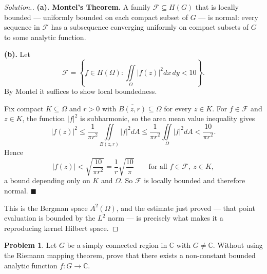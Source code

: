 \documentclass[11pt,a4paper]{article}
\theoremstyle{definition}
\newtheorem{problemx}{Problem}[section]
\newenvironment{problem}{\begin{problemx}}{\end{problemx}}
\newenvironment{solution}
  {\renewcommand{\qedsymbol}{}\begin{proof}[\textit{Solution}.]}
  {\end{proof}}
\begin{document}
\begin{solution}
\textbf{(a). Montel's Theorem.} A family $\mathcal{F} \subseteq H(G)$ that is
locally bounded --- uniformly bounded on each compact subset of $G$ --- is normal:
every sequence in $\mathcal{F}$ has a subsequence converging uniformly on compact
subsets of $G$ to some analytic function.

\textbf{(b).} Let
$$\mathcal{F} = \left\{ f \in H(\Omega) :
\iint\limits_{\Omega}\left|f(z)\right|^{2}dx\,dy < 10 \right\}.$$
By Montel it suffices to show local boundedness.

Fix compact $K \subseteq \Omega$ and $r > 0$ with
$\overline{B(z,r)} \subseteq \Omega$ for every $z \in K$. For $f \in \mathcal{F}$
and $z \in K$, the function $\left|f\right|^{2}$ is subharmonic, so the area
mean value inequality gives
$$\left|f(z)\right|^{2}
\leq \frac{1}{\pi r^{2}}\iint\limits_{B(z,r)}\left|f\right|^{2}dA
\leq \frac{1}{\pi r^{2}}\iint\limits_{\Omega}\left|f\right|^{2}dA
< \frac{10}{\pi r^{2}} .$$
Hence
$$\left|f(z)\right| < \sqrt{\frac{10}{\pi r^{2}}}
= \frac{1}{r}\sqrt{\frac{10}{\pi}} \qquad\text{for all } f \in \mathcal{F},\ z\in K,$$
a bound depending only on $K$ and $\Omega$. So $\mathcal{F}$ is locally bounded and
therefore normal. $\blacksquare$

This is the Bergman space $A^{2}(\Omega)$, and the estimate just proved --- that
point evaluation is bounded by the $L^{2}$ norm --- is precisely what makes it a
reproducing kernel Hilbert space.
\end{solution}


\begin{problem}
Let $G$ be a simply connected region in $\mathbb{C}$ with $G \neq \mathbb{C}$.
Without using the Riemann mapping theorem, prove that there exists a
non-constant bounded analytic function $f : G \rightarrow \mathbb{C}$.
\end{problem}
\end{document}
